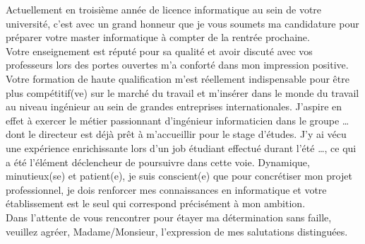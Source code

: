 \documentclass[11pt, a4paper]{awesome-cv}
\begin{document}
\makecvheader

\makelettertitle

\begin{cvletter}
\cvparagraph
 Actuellement en troisième année de licence informatique au sein de votre université, c’est avec un grand honneur que je vous soumets ma candidature pour préparer votre master informatique à compter de la rentrée prochaine. \\
Votre enseignement est réputé pour sa qualité et avoir discuté avec vos professeurs lors des portes ouvertes m’a conforté dans mon impression positive. Votre formation de haute qualification m’est réellement indispensable pour être plus compétitif(ve) sur le marché du travail et m’insérer dans le monde du travail au niveau ingénieur au sein de grandes entreprises internationales. J’aspire en effet à exercer le métier passionnant d’ingénieur informaticien dans le groupe … dont le directeur est déjà prêt à m’accueillir pour le stage d’études. J’y ai vécu une expérience enrichissante lors d’un job étudiant effectué durant l’été …, ce qui a été l’élément déclencheur de poursuivre dans cette voie. Dynamique, minutieux(se) et patient(e), je suis conscient(e) que pour concrétiser mon projet professionnel, je dois renforcer mes connaissances en informatique et votre établissement est le seul qui correspond précisément à mon ambition.\\
Dans l’attente de vous rencontrer pour étayer ma détermination sans faille, veuillez agréer, Madame/Monsieur, l’expression de mes salutations distinguées.


\makeletterclosing
\end{cvletter}
\end{document}
